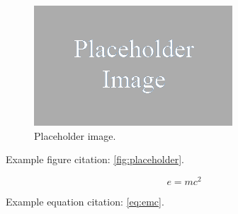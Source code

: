 \documentclass[paper=a4,twoside,captions=tableheading,index=totoc,hyperref]{labbook}
\begin{document}


\lipsum[4]

\begin{figure}[h!]
\raggedleft
\includegraphics[scale=0.5,keepaspectratio=true]{placeholder.png}
\caption{Placeholder image.}
\label{fig:placeholder}
\end{figure}

\lipsum[5]

Example figure citation: \autoref{fig:placeholder}.



\lipsum[6]



\lipsum[7]



\lipsum[8]



  
\lipsum[9]




\lipsum[10]

\begin{equation}
\label{eq:emc}
e = mc^2
\end{equation}

Example equation citation: \autoref{eq:emc}.

\end{document}

